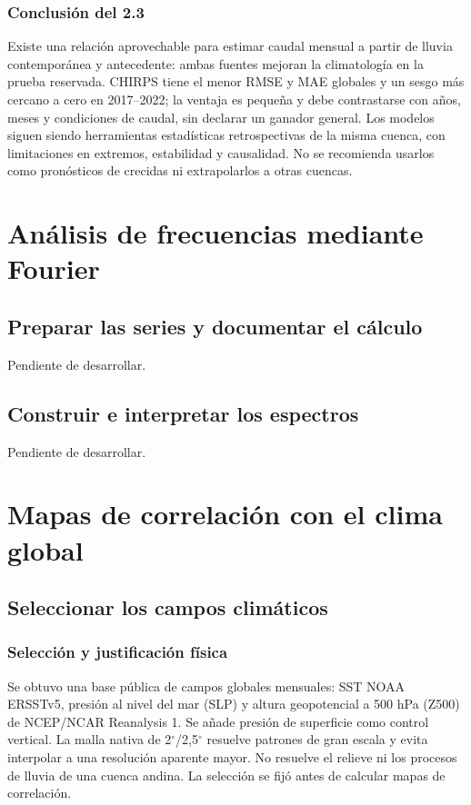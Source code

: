 \documentclass[10pt,a4paper]{article}
\begin{document}
\subsubsection*{Conclusión del 2.3}
Existe una relación aprovechable para estimar caudal mensual a partir de lluvia contemporánea y antecedente: ambas fuentes mejoran la climatología en la prueba reservada. CHIRPS tiene el menor RMSE y MAE globales y un sesgo más cercano a cero en 2017--2022; la ventaja es pequeña y debe contrastarse con años, meses y condiciones de caudal, sin declarar un ganador general. Los modelos siguen siendo herramientas estadísticas retrospectivas de la misma cuenca, con limitaciones en extremos, estabilidad y causalidad. No se recomienda usarlos como pronósticos de crecidas ni extrapolarlos a otras cuencas.
\clearpage

\section{Análisis de frecuencias mediante Fourier}
\subsection{Preparar las series y documentar el cálculo}
Pendiente de desarrollar.
\subsection{Construir e interpretar los espectros}
Pendiente de desarrollar.
\clearpage
\section{Mapas de correlación con el clima global}
\subsection{Seleccionar los campos climáticos}
\subsubsection*{Selección y justificación física}
Se obtuvo una base pública de campos globales mensuales: SST NOAA ERSSTv5, presión al nivel del mar (SLP) y altura geopotencial a 500 hPa (Z500) de NCEP/NCAR Reanalysis 1. Se añade presión de superficie como control vertical. La malla nativa de 2$^\circ$/2,5$^\circ$ resuelve patrones de gran escala y evita interpolar a una resolución aparente mayor. No resuelve el relieve ni los procesos de lluvia de una cuenca andina. La selección se fijó antes de calcular mapas de correlación.
\end{document}
